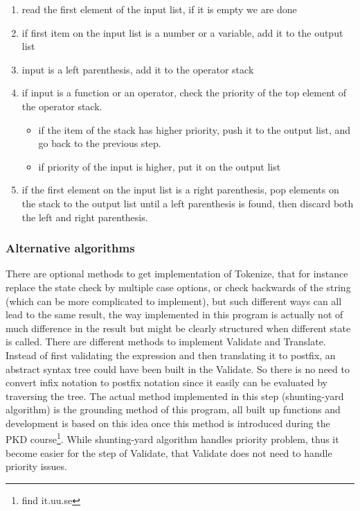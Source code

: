 \documentclass[12pt,a4paper]{article}
\begin{document}
\begin {enumerate}
\item read the first element of the input list, if it is empty we are done
\item if first item on the input list is a number or a variable, add it to the output list
\item input is a left parenthesis, add it to the operator stack
\item if input is a function or an operator, check the priority of the top element of the operator stack.
\begin{itemize}
\item if the item of the stack has higher priority, push it to the output list, and go back to the previous step.
\item if priority of the input is higher, put it on the output list
\end{itemize}
\item if the first element on the input list is a right parenthesis, pop elements on the stack to the output list until a left parenthesis is found, then discard both the left and right parenthesis.

\end{enumerate}

\subsubsection{Alternative algorithms}
\textnormal{There are optional methods to get implementation of Tokenize, that for instance replace the state check by multiple case options, or check backwards of the string (which can be more complicated to implement), but such different ways can all lead to the same result, the way implemented in this program is actually not of much difference in the result but might be clearly structured when different state is called. \newline \newline There are different methods to implement Validate and Translate. Instead of first validating the expression and then translating it to postfix, an abstract syntax tree could have been built in the Validate. So there is no need to convert infix notation to postfix notation since it easily can be evaluated by traversing the tree. \newline \newline The actual method implemented in this step (shunting-yard algorithm) is the grounding method of this program, all built up functions and development is based on this idea once this method is introduced during the PKD course\footnote{find it.uu.se}. While shunting-yard algorithm handles priority problem, thus it become easier for the step of Validate, that Validate does not need to handle priority issues.}
\end{document}
